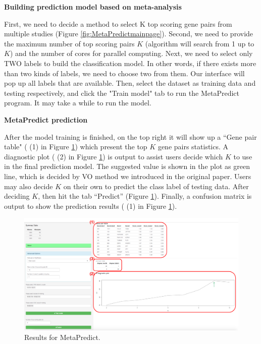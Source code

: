 \begin{steps}
\item \textbf{Building prediction model based on meta-analysis}

First, we need to decide a method to select K top scoring gene pairs from multiple studies (Figure \ref{fig:MetaPredictmainpage}). 
Second, we need to provide the maximum number of top scoring pairs $K$ (algorithm will search from 1 up to $K$) and the number of cores for parallel computing. 
Next, we need to select only TWO labels to build the classification model. 
In other words, if there exists more than two kinds of labels, we need to choose two from them. 
Our interface will pop up all labels that are available. 
Then, select the dataset as training data and testing respectively, 
and click the "Train model" tab to run the MetaPredict program. 
It may take a while to run the model.

\item \textbf{MetaPredict prediction}

After the model training is finished, on the top right it will show up a ``Gene pair table" ({\color{red} (1)} in Figure \ref{fig:MetaPredictresult}) which present the top $K$ gene pairs statistics. 
A diagnostic plot ({\color{red} (2)} in Figure \ref{fig:MetaPredictresult}) is output to assist users decide which $K$ to use in the final prediction model. 
The suggested value is shown in the plot as green line, which is decided by VO method we introduced in the original paper. Users may also decide $K$ on their own to predict the class label of testing data. 
After deciding $K$, then hit the tab ``Predict'' (Figure \ref{fig:MetaPredictresult}). 
Finally, a confusion matrix is output to show the prediction results ({\color{red} (1)} in Figure \ref{fig:MetaPredictresult}).

\begin{figure}[H]
\begin{center}
\includegraphics[scale=0.5]{./figure/MetaPredict/MetaPredictresult.pdf}
\caption{Results for MetaPredict.}
\label{fig:MetaPredictresult}
\end{center}
\end{figure}

\end{steps}

